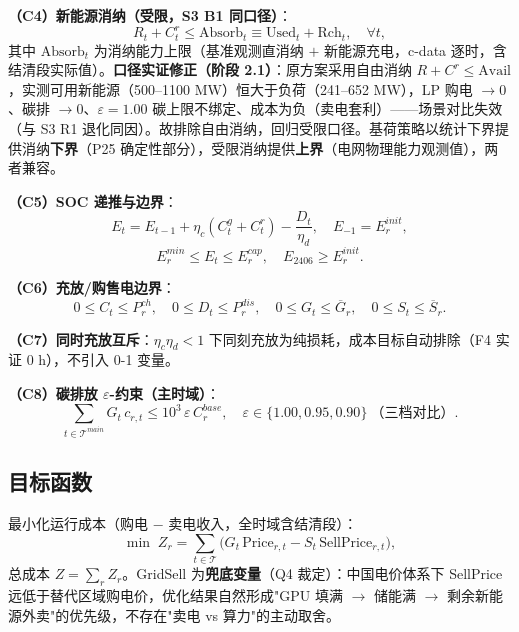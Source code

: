 \documentclass{internal-report}
\begin{document}
\textbf{（C4）新能源消纳（受限，S3 B1 同口径）}：
\begin{equation}
  R_t + C^r_t \le \text{Absorb}_t \equiv \text{Used}_t + \text{Rch}_t,\quad \forall t,
  \label{eq:c4}
\end{equation}
其中 $\text{Absorb}_t$ 为消纳能力上限（基准观测直消纳 $+$ 新能源充电，c-data 逐时，含结清段实际值）。\textbf{口径实证修正（阶段 2.1）}：原方案采用自由消纳 $R+C^r\le\text{Avail}$，实测可用新能源（500--1100 MW）恒大于负荷（241--652 MW），LP 购电 $\to 0$、碳排 $\to 0$、$\varepsilon=1.00$ 碳上限不绑定、成本为负（卖电套利）——场景对比失效（与 S3 R1 退化同因）。故排除自由消纳，回归受限口径。基荷策略以统计下界提供消纳\textbf{下界}（P25 确定性部分），受限消纳提供\textbf{上界}（电网物理能力观测值），两者兼容。

\textbf{（C5）SOC 递推与边界}：
\begin{equation}
  E_t = E_{t-1} + \eta_c (C^g_t + C^r_t) - \frac{D_t}{\eta_d},\quad E_{-1}=E^{init}_r,
  \label{eq:c5}
\end{equation}
\begin{equation}
  E^{min}_r \le E_t \le E^{cap}_r,\quad E_{2406} \ge E^{init}_r.
  \label{eq:c6}
\end{equation}

\textbf{（C6）充放/购售电边界}：
\begin{equation}
  0\le C_t\le P^{ch}_r,\quad 0\le D_t\le P^{dis}_r,\quad
  0\le G_t\le \overline{G}_r,\quad 0\le S_t\le \overline{S}_r.
  \label{eq:c7}
\end{equation}

\textbf{（C7）同时充放互斥}：$\eta_c\eta_d<1$ 下同刻充放为纯损耗，成本目标自动排除（F4 实证 0 h），不引入 0-1 变量。

\textbf{（C8）碳排放 $\varepsilon$-约束（主时域）}：
\begin{equation}
  \sum_{t\in\mathcal{T}^{main}} G_t\, c_{r,t} \le 10^3\, \varepsilon\, C^{base}_r,\quad
  \varepsilon\in\{1.00,0.95,0.90\}\ \text{（三档对比）}.
  \label{eq:c8}
\end{equation}

\subsection{目标函数}

最小化运行成本（购电 $-$ 卖电收入，全时域含结清段）：
\begin{equation}
  \min\; Z_r = \sum_{t\in\mathcal{T}} \big( G_t\, \text{Price}_{r,t} - S_t\, \text{SellPrice}_{r,t} \big),
  \label{eq:obj}
\end{equation}
总成本 $Z=\sum_r Z_r$。GridSell 为\textbf{兜底变量}（Q4 裁定）：中国电价体系下 SellPrice 远低于替代区域购电价，优化结果自然形成"GPU 填满 $\to$ 储能满 $\to$ 剩余新能源外卖"的优先级，不存在"卖电 vs 算力"的主动取舍。
\end{document}
